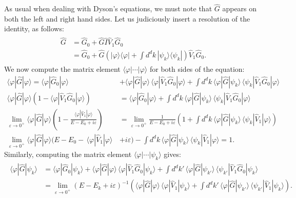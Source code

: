 \documentclass[pra,12pt]{revtex4}
\begin{document}
As usual when dealing with Dyson's equations, we must note that
$\hat{G}$ appears on both the left and right hand sides.  Let us
judiciously insert a resolution of the identity, as follows:
\begin{align}
  \begin{aligned}\hat{G} &= \hat{G}_0 + \hat{G} \hat{I} \hat{V}_1 \hat{G}_0 \\ &= \hat{G}_0 + \hat{G} \left(|\varphi\rangle\langle\varphi| + \int d^dk\, |\psi_k\rangle\langle\psi_k|\right) \hat{V}_1 \hat{G}_0. \end{aligned}
\end{align}
We now compute the matrix element
$\langle\varphi|\cdots|\varphi\rangle$ for both sides of the equation:
\begin{align}
    \langle\varphi|\hat{G}|\varphi\rangle = \langle\varphi|\hat{G}_0|\varphi\rangle &+ \langle\varphi|\hat{G}|\varphi\rangle \, \langle\varphi|\hat{V}_1 \hat{G}_0|\varphi\rangle + \int d^dk\, \langle\varphi|\hat{G}|\psi_k\rangle \, \langle\psi_k| \hat{V}_1 \hat{G}_0|\varphi\rangle \nonumber\\
    \langle\varphi|\hat{G}|\varphi\rangle \left(1 - \langle\varphi|\hat{V}_1 \hat{G}_0|\varphi\rangle\right) &= \langle\varphi|\hat{G}_0|\varphi\rangle + \int d^dk\, \langle\varphi|\hat{G}|\psi_k\rangle \, \langle\psi_k| \hat{V}_1 \hat{G}_0|\varphi\rangle \nonumber\\
    \lim_{\varepsilon\rightarrow0^+}
    \langle\varphi|\hat{G}|\varphi\rangle \left(1 - \frac{\langle\varphi|\hat{V}_1|\varphi\rangle}{E - E_0 + i\varepsilon}\right) &= \lim_{\varepsilon\rightarrow0^+} \frac{1}{E  - E_0 + i\varepsilon} \left(1+ \int d^dk\, \langle\varphi|\hat{G}|\psi_k\rangle \, \langle\psi_k| \hat{V}_1|\varphi\rangle \right) \nonumber\\
    \lim_{\varepsilon\rightarrow0^+} \langle\varphi|\hat{G}|\varphi\rangle \Big(E - E_0 -\, \langle\varphi|\hat{V}_1|\varphi\rangle \, & + i\varepsilon\Big) - \int d^dk\, \langle\varphi|\hat{G}|\psi_k\rangle \, \langle\psi_k| \hat{V}_1|\varphi\rangle = 1. \label{psiGphi}
\end{align}
Similarly, computing the matrix element
$\langle\varphi|\cdots|\psi_k\rangle$ gives:
\begin{align*}
  \begin{aligned}
\langle\varphi|\hat{G}|\psi_k\rangle &= \langle\varphi|\hat{G}_0|\psi_k\rangle + \langle\varphi|\hat{G}|\varphi\rangle \, \langle\varphi|\hat{V}_1 \hat{G}_0|\psi_k\rangle + \int d^dk'\, \langle\varphi|\hat{G}|\psi_{k'}\rangle \, \langle\psi_{k'}| \hat{V}_1 \hat{G}_0|\psi_k\rangle \\
&= \lim_{\varepsilon\rightarrow0^+} \left(E-E_k+i\varepsilon\right)^{-1} \left(\langle\varphi|\hat{G}|\varphi\rangle \, \langle\varphi|\hat{V}_1|\psi_k\rangle + \int d^dk'\, \langle\varphi|\hat{G}|\psi_{k'}\rangle \, \langle\psi_{k'}| \hat{V}_1|\psi_k\rangle\right).\end{aligned}
\end{align*}
\end{document}
